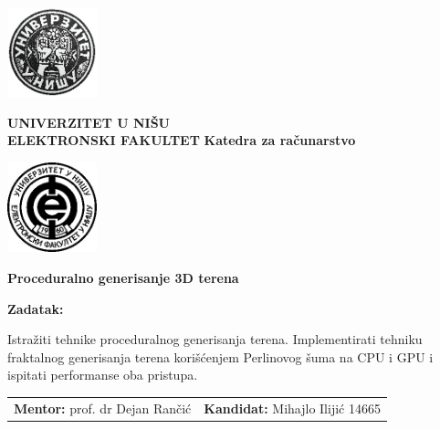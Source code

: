 \documentclass[a4paper,12pt,titlepage]{article}
\begin{document}
\begin{titlepage}
    \begin{center}
    
        \includegraphics[width=2.6cm]{img/uni.png}%
        \begin{minipage}[b]{0.7\textwidth}
            \centering
            \Large
            \textbf{UNIVERZITET U NIŠU\\ ELEKTRONSKI FAKULTET}       
            \large
            \textbf{Katedra za računarstvo}
        \end{minipage}%
        \includegraphics[width=2.6cm]{img/elfak.png}
        
              
      
        \vspace{5cm}
        \Large
        \textbf{Proceduralno generisanje 3D terena}
        
        \vspace{0.6cm}
        \normalsize
    \end{center}
    
    \vspace{1cm}
   
    \textbf{Zadatak:}
    
    \vspace{0.2cm}
    
    \setlength{\leftskip}{0.6cm}
    \noindent
    Istražiti tehnike proceduralnog generisanja terena.
    Implementirati tehniku fraktalnog generisanja terena korišćenjem Perlinovog šuma na CPU i GPU i ispitati performanse oba pristupa.
    
    \vspace{1cm}
    
    \noindent \begin{tabu} to 
        \textbf{Mentor:} prof. dr Dejan Rančić &
        \textbf{Kandidat:} Mihajlo Ilijić 14665
    \end{tabu}
    

\end{titlepage}
\end{document}
